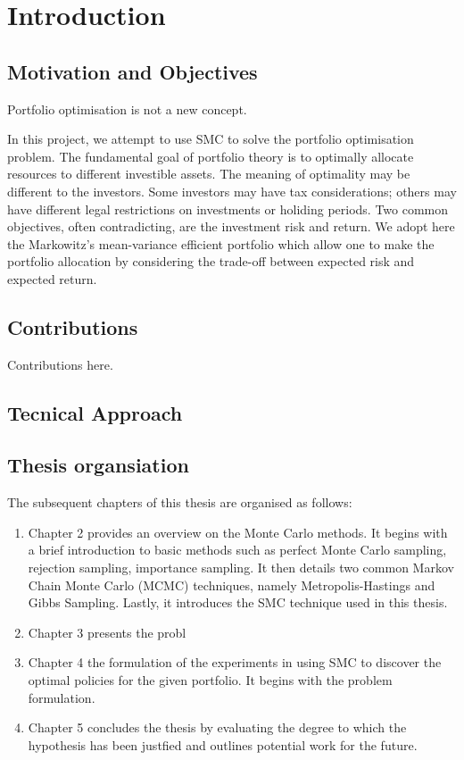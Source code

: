 
\chapter{Introduction}

\section{Motivation and Objectives}
Portfolio optimisation is not a new concept. 



In this project, we attempt to use SMC to solve the portfolio optimisation problem. The fundamental goal of portfolio theory is to optimally allocate resources to different investible assets. The meaning of optimality may be different to the investors. Some investors may have tax considerations; others may have different legal restrictions on investments or holiding periods. Two common objectives, often contradicting, are the investment risk and return. We adopt here the Markowitz's mean-variance efficient portfolio which allow one to make the portfolio allocation by considering the trade-off between expected risk and expected return. 

\section{Contributions}

Contributions here.


\section{Tecnical Approach}


\section{Thesis organsiation}
The subsequent chapters of this thesis are organised as follows:
\begin{enumerate}
\item Chapter 2 provides an overview on the Monte Carlo methods. It begins with a brief introduction to basic methods such as perfect Monte Carlo sampling, rejection sampling, importance sampling. It then details two common Markov Chain Monte Carlo (MCMC) techniques, namely Metropolis-Hastings and Gibbs Sampling. Lastly, it introduces the SMC technique used in this thesis. 
\item Chapter 3 presents the probl
\item Chapter 4 the formulation of the experiments in using SMC to discover the optimal policies for the given portfolio. It begins with the problem formulation.

\item Chapter 5 concludes the thesis by evaluating the degree to which the hypothesis has been justfied and outlines potential work for the future.
\end{enumerate}

